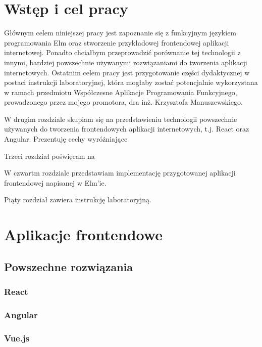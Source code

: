 \documentclass[twoside,a4paper]{report}
\begin{document}

\chapter{Wstęp i cel pracy}
Głównym celem niniejszej pracy jest zapoznanie się z funkcyjnym językiem programowania Elm oraz stworzenie przykładowej frontendowej aplikacji internetowej.
Ponadto chciałbym przeprowadzić porównanie tej technologii z innymi, bardziej powszechnie używanymi rozwiązaniami do tworzenia aplikacji internetowych.
Ostatnim celem pracy jest przygotowanie części dydaktycznej w postaci instrukcji laboratoryjnej, która mogłaby zostać potencjalnie wykorzystana w ramach przedmiotu Współczesne Aplikacje Programowania Funkcyjnego, prowadzonego przez mojego promotora, dra inż. Krzysztofa Manuszewskiego.

W drugim rozdziale skupiam się na przedstawieniu technologii powszechnie używanych do tworzenia frontendowych aplikacji internetowych, t.j. React oraz Angular.
Prezentuję cechy wyróżniające

Trzeci rozdział poświęcam na

W czwartm rozdziale przedstawiam implementację przygotowanej aplikacji frontendowej napisanej w Elm'ie.

Piąty rozdział zawiera instrukcję laboratoryjną.


\chapter{Aplikacje frontendowe}

\section{Powszechne rozwiązania}

\subsection{React}
\cite{react}
\cite{reactdocs}
\subsection{Angular}
\cite{angularjs}
\cite{angulardocs}
\subsection{Vue.js}
\cite{vuejsdocs}
\end{document}
